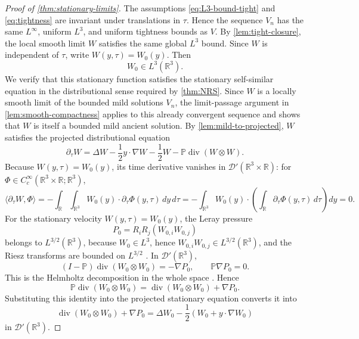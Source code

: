 \documentclass[11pt]{amsart}
\theoremstyle{plain}
\theoremstyle{definition}
\theoremstyle{remark}
\numberwithin{equation}{section}
\begin{document}
\begin{proof}[Proof of \cref{thm:stationary-limits}]
The assumptions \eqref{eq:L3-bound-tight} and \eqref{eq:tightness} are
invariant under translations in \(\tau\).  Hence the sequence \(V_n\) has the
same \(L^\infty\), uniform \(L^3\), and uniform tightness bounds as \(V\).  By
\cref{lem:tight-closure}, the local smooth limit \(W\) satisfies the same
global \(L^3\) bound.  Since \(W\) is
independent of \(\tau\), write \(W(y,\tau)=W_0(y)\).  Then
\[
   W_0\in L^3(\mathbb R^3).
\]
We verify that this stationary function satisfies the
stationary self-similar equation in the distributional sense required by
\cref{thm:NRS}.  Since \(W\) is a
locally smooth limit of the bounded mild solutions \(V_n\), the limit-passage
argument in \cref{lem:smooth-compactness} applies to this already convergent
sequence and shows that \(W\) is itself a bounded mild ancient solution.
By \cref{lem:mild-to-projected}, \(W\) satisfies the projected
distributional equation
\[
   \partial_\tau W
   =
   \Delta W-\frac12y\cdot\nabla W-\frac12W
   -\mathbb P\operatorname{div}(W\otimes W).
\]
Because \(W(y,\tau)=W_0(y)\), its time derivative vanishes in
\(\mathcal D'(\mathbb R^3\times\mathbb R)\): for
\(\Phi\in C_c^\infty(\mathbb R^3\times\mathbb R;\mathbb R^3)\),
\[
   \langle \partial_\tau W,\Phi\rangle
   =
   -\int_{\mathbb R}\int_{\mathbb R^3}W_0(y)\cdot\partial_\tau\Phi(y,\tau)\,dy\,d\tau
   =
   -\int_{\mathbb R^3}W_0(y)\cdot
      \left(\int_{\mathbb R}\partial_\tau\Phi(y,\tau)\,d\tau\right)dy
   =
   0 .
\]
For the stationary velocity \(W(y,\tau)=W_0(y)\), the Leray pressure
\[
   P_0=R_iR_j(W_{0,i}W_{0,j})
\]
belongs to \(L^{3/2}(\mathbb R^3)\), because \(W_0\in L^3\), hence
\(W_{0,i}W_{0,j}\in L^{3/2}(\mathbb R^3)\), and the Riesz transforms are
bounded on \(L^{3/2}\) \cite{Stein1970}.  In
\(\mathcal D'(\mathbb R^3)\),
\[
   (I-\mathbb P)\operatorname{div}(W_0\otimes W_0)=-\nabla P_0,
   \qquad
   \mathbb P\nabla P_0=0.
\]
This is the Helmholtz decomposition in the whole space
\cite{Sohr2001,Galdi2011}.  Hence
\[
   \mathbb P\operatorname{div}(W_0\otimes W_0)
   =
   \operatorname{div}(W_0\otimes W_0)+\nabla P_0 .
\]
Substituting this identity into the projected stationary equation converts it
into
\[
   \operatorname{div}(W_0\otimes W_0)+\nabla P_0
   =
   \Delta W_0-\frac12(W_0+y\cdot\nabla W_0)
\]
in \(\mathcal D'(\mathbb R^3)\).


\end{proof}
\end{document}
